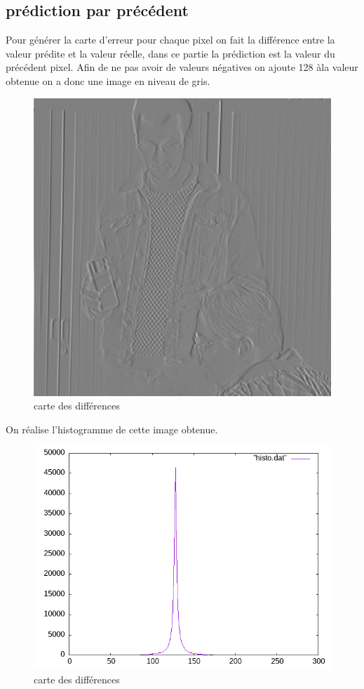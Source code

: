 \documentclass{article}
\begin{document}
\subsection{prédiction par précédent}
Pour générer la carte d'erreur pour chaque pixel on fait la différence entre la valeur prédite et la valeur réelle, dans ce partie la prédiction est la valeur du précédent pixel.
Afin de ne pas avoir de valeurs négatives on ajoute 128 àla valeur obtenue on a donc une image en niveau de gris.
\begin{figure}[h]
\centerline{\includegraphics[scale=0.7]{./rendus/MaribaultErreurPredPrec.png} }
\caption{carte des différences}
\end{figure}

On réalise l'histogramme de cette image obtenue.

\begin{figure}[h]
\centerline{\includegraphics[scale=0.7]{./rendus/histoPredPrec.png} }
\caption{carte des différences}
\end{figure}
\end{document}
